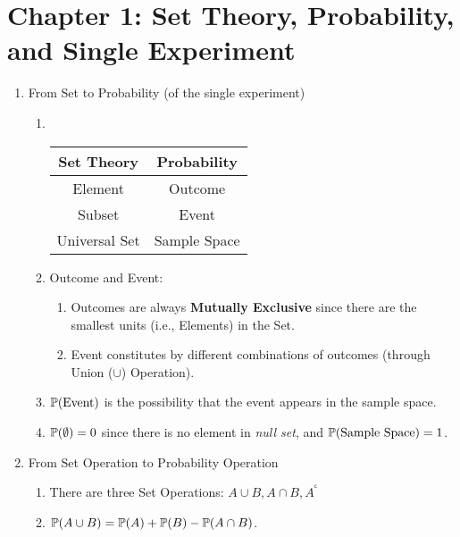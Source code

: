 \section*{Chapter 1: Set Theory, Probability, and Single Experiment}
\begin{enumerate}
    \item From Set to Probability (of the single experiment)
    \begin{enumerate}
        \item~{
            \begin{center}
                \begin{tabular}{|c|c|}
                    \hline
                    \textbf{Set Theory} & \textbf{Probability} \\
                    \hline
                    \hline
                    Element & Outcome \\
                    \hline
                    Subset  & Event   \\
                    \hline
                    Universal Set & Sample Space \\
                    \hline
                \end{tabular}
            \end{center}
                        }
            \item Outcome and Event: {
                \begin{enumerate}
                    \item Outcomes are always \textbf{Mutually Exclusive} since there are the smallest units (i.e., Elements) in the Set.
                    \item Event constitutes by different combinations of outcomes (through Union ($\cup$) Operation).
                \end{enumerate}
            } 
            \item $\P{\text{Event}}$ is the possibility that the event appears in the sample space. 
            \item $\P{\emptyset}=0$ since there is no element in \textit{null set}, and $\P{\text{Sample Space}}=1$.
    \end{enumerate}
    \item From Set Operation to Probability Operation
    \begin{enumerate}
        \item There are three Set Operations: $A \cup B, A \cap B, A^{^\mathsf{c}}$
        \item $\P{A \cup B} = \P{A}+\P{B}-\P{A\cap B}$.

\end{enumerate}
\end{enumerate}
